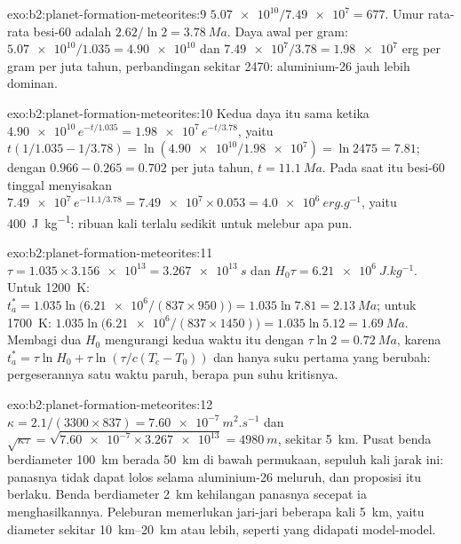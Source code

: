 \begin{solution}{exo:b2:planet-formation-meteorites:9}
$\num{5.07e10}/\num{7.49e7} = 677$. Umur rata-rata besi-60 adalah
$2.62/\ln2 = \qty{3.78}{Ma}$. Daya awal per gram:
$\num{5.07e10}/1.035 = \num{4.90e10}$ dan $\num{7.49e7}/3.78 = \num{1.98e7}$ erg per
gram per juta tahun, perbandingan sekitar \num{2470}: aluminium-26 jauh lebih dominan.
\end{solution}

\begin{solution}{exo:b2:planet-formation-meteorites:10}
Kedua daya itu sama ketika $\num{4.90e10}\,e^{-t/1.035} = \num{1.98e7}\,e^{-t/3.78}$,
yaitu $t(1/1.035 - 1/3.78) = \ln(\num{4.90e10}/\num{1.98e7}) = \ln 2475 = 7.81$;
dengan $0.966 - 0.265 = 0.702$ per juta tahun, $t = \qty{11.1}{Ma}$. Pada saat itu
besi-60 tinggal menyisakan $\num{7.49e7}\,e^{-11.1/3.78} = \num{7.49e7}\times0.053 =
\qty{4.0e6}{erg.g^{-1}}$, yaitu \qty{400}{J.kg^{-1}}: ribuan kali terlalu
sedikit untuk melebur apa pun.
\end{solution}

\begin{solution}{exo:b2:planet-formation-meteorites:11}
$\tau = 1.035\times\num{3.156e13} = \qty{3.267e13}{s}$ dan
$H_0\tau = \qty{6.21e6}{J.kg^{-1}}$. Untuk \qty{1200}{K}:
$t_a^* = 1.035\ln\bigl(\num{6.21e6}/(837\times950)\bigr) = 1.035\ln7.81 =
\qty{2.13}{Ma}$; untuk \qty{1700}{K}: $1.035\ln\bigl(\num{6.21e6}/(837\times1450)\bigr)
= 1.035\ln5.12 = \qty{1.69}{Ma}$. Membagi dua $H_0$ mengurangi kedua waktu itu dengan $\tau\ln2 =
\qty{0.72}{Ma}$, karena $t_a^* = \tau\ln H_0 + \tau\ln(\tau/c(T_c -
T_0))$ dan hanya suku pertama yang berubah: pergeserannya satu waktu paruh, berapa pun
suhu kritisnya.
\end{solution}

\begin{solution}{exo:b2:planet-formation-meteorites:12}
$\kappa = 2.1/(3300\times837) = \qty{7.60e-7}{m^2.s^{-1}}$ dan
$\sqrt{\kappa\tau} = \sqrt{\num{7.60e-7}\times\num{3.267e13}} = \qty{4980}{m}$,
sekitar \qty{5}{km}. Pusat benda berdiameter \qty{100}{km} berada \qty{50}{km} di bawah permukaan,
sepuluh kali jarak ini: panasnya tidak dapat lolos selama aluminium-26 meluruh, dan
proposisi itu berlaku. Benda berdiameter \qty{2}{km} kehilangan panasnya secepat ia
menghasilkannya. Peleburan memerlukan jari-jari beberapa kali \qty{5}{km}, yaitu diameter sekitar
\qtyrange{10}{20}{km} atau lebih, seperti yang didapati model-model.
\end{solution}

